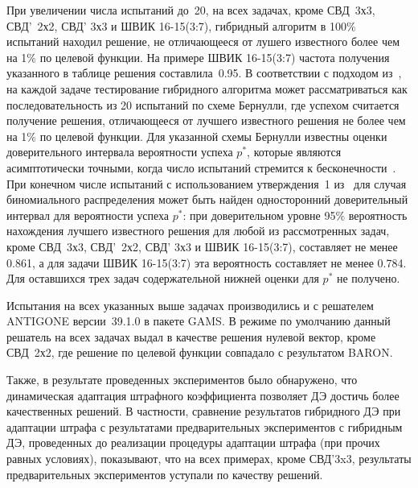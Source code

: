 При увеличении числа испытаний до~20, на всех задачах, кроме СВД~3х3,  СВД'~2х2, СВД' 3х3 и ШВИК 16-15(3:7), гибридный алгоритм в 100\% испытаний находил решение, не отличающееся от лушего известного  более чем на 1\% по целевой функции. На примере ШВИК 16-15(3:7) частота получения указанного в таблице решения составлила~0.95. 
В соответствии с подходом из~\cite{GK},
на каждой задаче тестирование гибридного алгоритма может рассматриваться
как последовательность из 20 испытаний по схеме Бернулли, где
успехом считается получение решения, отличающееся от лучшего известного решения не более чем на 1\% по целевой функции.
Для указанной схемы Бернулли известны
оценки доверительного интервала вероятности
успеха $p^*$, которые являются асимптотически точными,
когда число испытаний стремится к бесконечности~\cite{Kramer}.
При конечном числе испытаний с использованием утверждения~1 из~\cite{eremeev:confidence} для случая биномиального распределения 
 может быть найден односторонний доверительный интервал для вероятности успеха $p^*$: при доверительном уровне 95\%
вероятность нахождения лучшего известного решения для любой из рассмотренных задач, кроме СВД~3х3,  СВД'~2х2, СВД' 3х3 и ШВИК 16-15(3:7), 
составляет не менее 0.861, а для задачи ШВИК 16-15(3:7) эта вероятность составляет не менее 0.784. Для оставшихся трех задач содержательной нижней оценки для $p^*$ не получено. 

Испытания на всех указанных выше задачах производились и с решателем ANTIGONE версии~39.1.0 в пакете GAMS. В режиме по умолчанию данный решатель на всех задачах выдал в качестве решения нулевой вектор, кроме СВД~2х2, где решение по целевой функции совпадало с результатом BARON. 

Также, в результате проведенных экспериментов было обнаружено, что динамическая адаптация штрафного коэффициента позволяет ДЭ достичь более качественных решений.
В частности, сравнение результатов гибридного ДЭ при адаптации штрафа с результатами предварительных экспериментов с гибридным ДЭ, проведенных до реализации процедуры адаптации штрафа (при прочих равных условиях), показывают, что на всех примерах, кроме СВД'3x3, результаты предварительных экспериментов уступали по качеству решений.

